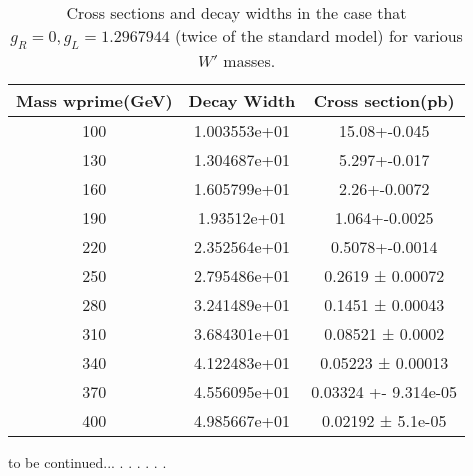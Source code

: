  \begin{table}[htb]
	\centering
\begin{tabular}{|ccc|}
\hline 
Mass wprime(GeV)  &  Decay Width  &  Cross section(pb)\\
\hline 
100& 1.003553e+01& 15.08+-0.045\\
130 &1.304687e+01& 5.297+-0.017\\
160& 1.605799e+01& 2.26+-0.0072 \\
190&1.93512e+01& 1.064+-0.0025\\
220& 2.352564e+01& 0.5078+-0.0014\\
250& 2.795486e+01& 0.2619 ± 0.00072\\
280& 3.241489e+01& 0.1451 ± 0.00043\\
310& 3.684301e+01& 0.08521 ± 0.0002\\
340& 4.122483e+01& 0.05223 ± 0.00013\\
370& 4.556095e+01&0.03324 +- 9.314e-05\\
400& 4.985667e+01& 0.02192 ± 5.1e-05\\ 

\hline
\end{tabular}
\caption{Cross sections and decay widths in the case that $ g_R=0 , g_L=1.2967944  $ (twice of the standard model) for various $W'$ masses. \label{tab1} }
\end{table}

to be continued...
.
.
.
.
.
.


